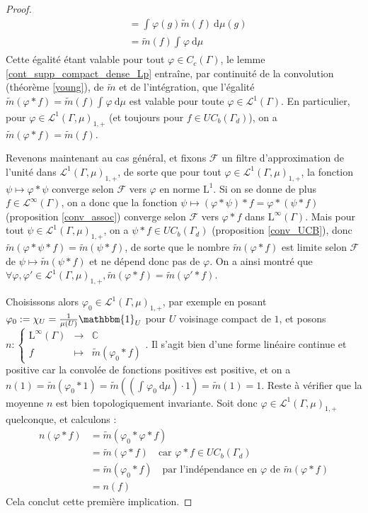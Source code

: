 \documentclass[a4paper,12pt]{article}
\newcommand{\C}{\mathbb{C}}
\newcommand{\indic}{\mathbbm{1}}
\newcommand{\integral}[4]{\int_{#1}^{#2} #3~\mathrm{d}#4}
\newcommand\fundef[3]{#1: \left\{\begin{array}{ccc}#2\\#3\end{array}\right.}
\begin{document}
\begin{proof}
\begin{align*}
            &= \integral{}{}{\varphi(g)\widetilde{m}(f)}{\mu(g)} \\
            &= \widetilde{m}(f)\integral{}{}{\varphi}{\mu}
    \end{align*}
    Cette égalité étant valable pour tout $\varphi\in C_c(\Gamma)$, le lemme \ref{cont_supp_compact_dense_Lp} entraîne, par continuité de la convolution (théorème \ref{young}),
    de $\widetilde{m}$ et de l'intégration, que l'égalité $\widetilde{m}(\varphi\ast f) = \widetilde{m}(f)\integral{}{}{\varphi}{\mu}$ est valable 
    pour toute $\varphi\in\mathscr{L}^1(\Gamma)$. En particulier, pour $\varphi\in\mathscr{L}^1(\Gamma, \mu)_{1, +}$ (et toujours pour 
    $f\in UC_b(\Gamma_d)$), on a $\widetilde{m}(\varphi\ast f) = \widetilde{m}(f)$.
    
    Revenons maintenant au cas général, et fixons $\mathscr{F}$ un filtre d'approximation de l'unité 
    dans $\mathscr{L}^1(\Gamma, \mu)_{1, +}$, de sorte que pour tout $\varphi\in\mathscr{L}^1(\Gamma, \mu)_{1, +}$, la fonction 
    $\psi\mapsto\varphi\ast\psi$ converge selon $\mathscr{F}$ vers $\varphi$ en norme $\mathrm{L}^1$. 
    Si on se donne de plus $f\in\mathscr{L}^\infty(\Gamma)$, on a donc que la fonction $\psi\mapsto(\varphi\ast\psi)\ast f = \varphi\ast(\psi\ast f)$
    (proposition \ref{conv_assoc}) converge selon $\mathscr{F}$ vers $\varphi\ast f$ dans $\mathrm{L}^\infty(\Gamma)$. Mais pour tout $\psi\in\mathscr{L}^1(\Gamma, \mu)_{1, +}$, on
    a $\psi\ast f\in UC_b(\Gamma_d)$ (proposition \ref{conv_UCB}), donc $\widetilde{m}(\varphi\ast\psi\ast f) = \widetilde{m}(\psi\ast f)$,
    de sorte que le nombre $\widetilde{m}(\varphi\ast f)$ est limite selon $\mathscr{F}$ de $\psi\mapsto\widetilde{m}(\psi\ast f)$ et 
    ne dépend donc pas de $\varphi$. On a ainsi montré que $\forall\varphi, \varphi'\in\mathscr{L}^1(\Gamma, \mu)_{1, +}, \widetilde{m}(\varphi\ast f) = \widetilde{m}(\varphi'\ast f)$.

    Choisissons alors $\varphi_0\in\mathscr{L}^1(\Gamma, \mu)_{1, +}$, par exemple en posant $\varphi_0:=\chi_U=\frac{1}{\mu(U)}\indic_U$ pour 
    $U$ voisinage compact de $1$, et posons $\fundef{n}{\mathrm{L}^\infty(\Gamma)&\to&\C}{f&\mapsto&\widetilde{m}(\varphi_0\ast f)}$. Il s'agit bien d'une 
    forme linéaire continue et positive car la convolée de fonctions positives est positive, et on a $n(1)=\widetilde{m}(\varphi_0\ast 1) = \widetilde{m}\left(\left(\integral{}{}{\varphi_0}{\mu}\right)\cdot 1\right) = \widetilde{m}(1) = 1$.
    Reste à vérifier que la moyenne $n$ est bien topologiquement invariante. Soit donc $\varphi\in\mathscr{L}^1(\Gamma, \mu)_{1, +}$ quelconque, et calculons :
    \begin{align*}
        n(\varphi\ast f) 
            &= \widetilde{m}(\varphi_0\ast\varphi\ast f) \\
            &= \widetilde{m}(\varphi\ast f) \quad\text{car } \varphi\ast f\in UC_b(\Gamma_d)\\
            &= \widetilde{m}(\varphi_0\ast f) \quad\text{par l'indépendance en $\varphi$ de $\widetilde{m}(\varphi\ast f)$} \\
            &= n(f)
    \end{align*}
    Cela conclut cette première implication. 


\end{proof}
\end{document}
